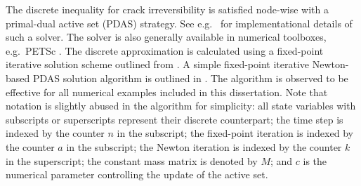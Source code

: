The discrete inequality for crack irreversibility is satisfied node-wise with a primal-dual active set (PDAS) strategy. See e.g.\  \citet{heister2015primal} for implementational details of such a solver. The solver is also generally available in numerical toolboxes, e.g.\  PETSc \cite{petsc-web-page}. The discrete approximation is calculated using a fixed-point iterative solution scheme outlined from \cite{HuGary2020}. A simple fixed-point iterative Newton-based PDAS solution algorithm is outlined in . The algorithm is observed to be effective for all numerical examples included in this dissertation. Note that notation is slightly abused in the algorithm for simplicity: all state variables with subscripts or superscripts represent their discrete counterpart; the time step is indexed by the counter $n$ in the subscript; the fixed-point iteration is indexed by the counter $a$ in the subscript; the Newton iteration is indexed by the counter $k$ in the superscript; the constant mass matrix is denoted by $M$; and $c$ is the numerical parameter controlling the update of the active set.

